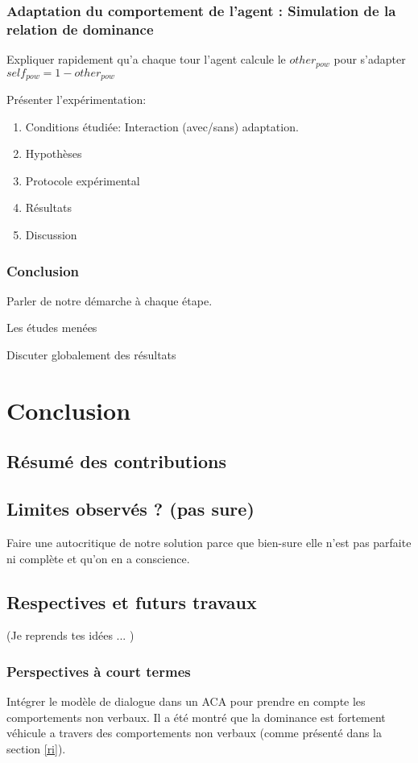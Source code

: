 \documentclass [french]{article}
\begin{document}
	\subsubsection{Adaptation du comportement de l'agent : Simulation de la relation de dominance}		
		Expliquer rapidement qu'a chaque tour l'agent calcule le $other_{pow}$ pour s'adapter $ self_{pow}= 1 - other_{pow}$
		
		Présenter l'expérimentation:
		
		\begin{enumerate}
			\item Conditions étudiée: Interaction (avec/sans) adaptation.
			\item Hypothèses
			\item Protocole expérimental
			\item Résultats
			\item Discussion
		\end{enumerate}
		
	\subsubsection{Conclusion}
		Parler de notre démarche à chaque étape.
		
		Les études menées
		
		Discuter globalement des résultats
	
	\section{Conclusion}
		\subsection{Résumé des contributions}
		
		\subsection{Limites observés ? (pas sure)}
			Faire une autocritique de notre solution parce que bien-sure elle n'est pas parfaite ni complète et qu'on en a conscience. 
		
		\subsection{Respectives et futurs travaux}
			(Je reprends tes idées ... )
			\subsubsection{Perspectives à court termes}
				Intégrer le modèle de dialogue dans un ACA pour prendre en compte les comportements non verbaux. Il a été montré que la dominance est fortement véhicule a travers des comportements non verbaux (comme présenté dans la section \ref{ri}).
			
\end{document}
